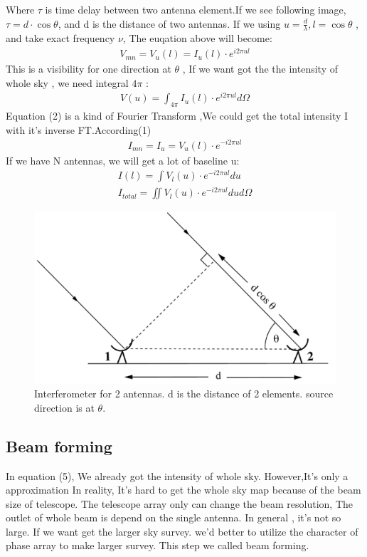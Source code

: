 \documentclass{article}
\begin{document}
Where $\tau$ is time delay between two antenna element.If we see following image, $\tau = d \cdot \cos\theta$, and d is the distance of two antennas. If we using $u=\frac{d}{\lambda},l=\cos\theta$ , and take exact frequency $\nu$, The euqation above will become:\\
\begin{eqnarray}
V_{mn}=V_{u}(l) = I_{u}(l) \cdot e^{i2\pi ul}
\end{eqnarray}
This is a visibility for one direction at $\theta$ , If we want got the the intensity of whole sky , we need integral $4\pi$ :
\begin{eqnarray}
V(u) = \int_{4\pi} I_u(l)\cdot e^{i2\pi ul} d\Omega 
\end{eqnarray}
Equation (2) is a kind of Fourier Transform ,We could get the total intensity I with it's inverse FT.According(1)
\begin{eqnarray}
I_{mn}=I_u = V_{u}(l)\cdot e^{-i2\pi ul}
\end{eqnarray}
If we have N antennas, we will get a lot of baseline u:
\begin{eqnarray}
I(l)=\int V_l(u)\cdot e^{-i2\pi ul} du\\
I_{total}=\iint V_l(u)\cdot e^{-i2\pi ul} dud\Omega
\end{eqnarray}
\begin{figure}
\includegraphics[width=\textwidth]{interferometer.png}
\caption{Interferometer for 2 antennas. d is the distance of 2 elements. source direction is at $\theta$.}
\end{figure}
\subsection{Beam forming}
In equation (5), We already got the intensity of whole sky. However,It's only a approximation In reality, It's hard to get the whole sky map because of the beam size of telescope. The telescope array only can change the beam resolution, The outlet of whole beam is depend on the single antenna. In general , it's not so large. If we want get the larger sky survey. we'd better to utilize the character of phase array to make larger survey. This step we called beam forming. \\
\end{document}
